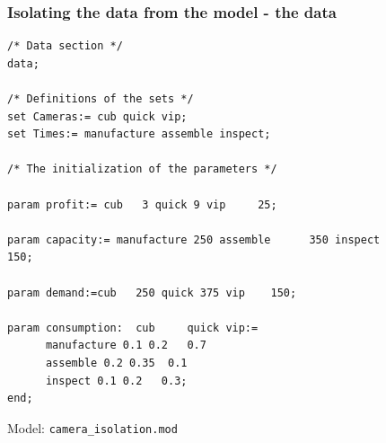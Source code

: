 \documentclass[landscape]{beamer}
\begin{document}
 \begin{frame}[fragile]
  \frametitle{Isolating  the data from the model - the data} 
\begin{tiny}
\begin{verbatim}
/* Data section */
data;

/* Definitions of the sets */
set Cameras:= cub quick vip;
set Times:= manufacture assemble inspect;

/* The initialization of the parameters */

param profit:= cub   3 quick 9 vip     25;

param capacity:= manufacture 250 assemble      350 inspect          150;

param demand:=cub   250 quick 375 vip    150;
			
param consumption: 	cub 	quick vip:=
      manufacture 0.1 0.2   0.7   
      assemble 0.2 0.35  0.1
      inspect 0.1 0.2   0.3;
end;
\end{verbatim}
\end{tiny}
Model:  \verb=camera_isolation.mod=
\end{frame} 
\end{document}
